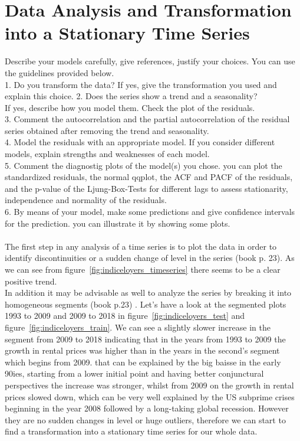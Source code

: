 \documentclass[11pt,a4paper]{article}
\begin{document}
\section{Data Analysis and Transformation into a Stationary Time Series}
Describe your models carefully, give references, justify your choices. You can use the guidelines provided below.
\\1. Do you transform the data? If yes, give the transformation you used and explain this choice. 2. Does the series show a trend and a seasonality? 
\\If yes, describe how you model them. Check the plot of the residuals. 
\\3. Comment the autocorrelation and the partial autocorrelation of the residual series obtained after removing the trend and seasonality.
\\4. Model the residuals with an appropriate model. If you consider different models, explain strengths and weaknesses of each model.
\\5. Comment the diagnostig plots of the model(s) you chose. you can plot the standardized residuals, the normal qqplot, the ACF and PACF of the residuals, and the p-value of the Ljung-Box-Tests for different lags to assess stationarity, independence and normality of the residuals.
\\6. By means of your model, make some predictions and give confidence intervals for the prediction. you can illustrate it by showing some plots.
\\
\\
The first step in any analysis of a time series is to plot the data in order to identify discontinuities or a sudden change of level in the series (book p. 23). As we can see from figure~\ref{fig:indiceloyers_timeseries} there seems to be a clear positive trend. 
\\In addition it may be advisable as well to analyze the series by breaking it into homogeneous segments (book p.23) . Let's have a look at the segmented plots  1993 to 2009 and 2009 to 2018 in figure~\ref{fig:indiceloyers_test} and figure~\ref{fig:indiceloyers_train}. We can see a slightly slower increase in the segment from 2009 to 2018 indicating that in the years from 1993 to 2009 the growth in rental prices was higher than in the years in the second's segment which begins from 2009. that can be explained by the big baisse in the early 90ies, starting from a lower initial point and having better conjunctural perspectives the increase was stronger, whilst from 2009 on the growth in rental prices slowed down, which can be very well explained by the US subprime crises beginning in the year 2008 followed by a long-taking global recession. However they are no sudden changes in level or huge outliers, therefore we can start to find a transformation into a stationary time series for our whole data.
\end{document}
